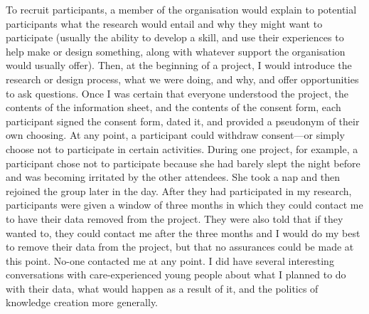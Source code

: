 To recruit participants, a member of the organisation would explain to potential participants what the research would entail and why they might want to participate (usually the ability to develop a skill, and use their experiences to help make or design something, along with whatever support the organisation would usually offer). Then, at the beginning of a project, I would introduce the research or design process, what we were doing, and why, and offer opportunities to ask questions. Once I was certain that everyone understood the project, the contents of the information sheet, and the contents of the consent form, each participant signed the consent form, dated it, and provided a pseudonym of their own choosing. At any point, a participant could withdraw consent—or simply choose not to participate in certain activities. During one project, for example, a participant chose not to participate because she had barely slept the night before and was becoming irritated by the other attendees. She took a nap and then rejoined the group later in the day. After they had participated in my research, participants were given a window of three months in which they could contact me to have their data removed from the project. They were also told that if they wanted to, they could contact me after the three months and I would do my best to remove their data from the project, but that no assurances could be made at this point. No-one contacted me at any point. I did have several interesting conversations with care-experienced young people about what I planned to do with their data, what would happen as a result of it, and the politics of knowledge creation more generally.

